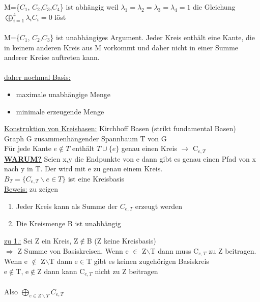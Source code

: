 M=\{$C_1$, $C_2$,$C_3$,$C_4$\} ist abhängig weil $\lambda_1=\lambda_2=\lambda_3=\lambda_4=1$ die Gleichung\\
$\bigoplus\limits_{i=1}^{4} \lambda_i C_i=0$ löst
\\\\
M=\{$C_1$, $C_2$,$C_3$\} ist unabhängiges Argument. Jeder Kreis enthält eine Kante, die in keinem anderen Kreis aus M vorkommt und daher nicht in einer Summe anderer Kreise auftreten kann.
\\\\
\underline{daher nochmal Basis:}
\begin{itemize}
	\item maximale unabhängige Menge
	\item minimale erzeugende Menge
\end{itemize}

\underline{Konstruktion von Kreisbasen:} Kirchhoff Basen (strikt fundamental Basen)
\\
Graph G zusammenhängender Spannbaum T von G\\
Für jede Kante $e\notin T$ enthält $T \cup \{e\}$ genau einen Kreis $\rightarrow$ C$_{e,T}$\\
\underline{\textbf{WARUM?}} Seien x,y die Endpunkte von e dann gibt es genau einen Pfad von x nach y in T. Der wird mit e zu genau einem Kreis.
\\
$B_T=\{C_{e,T}\backslash e \in T\}$ ist eine Kreisbasis
\\
\underline{Beweis:} zu zeigen
\begin{enumerate}
	\item Jeder Kreis kann als Summe der $C_{e,T}$ erzeugt werden
	\item Die Kreismenge B ist unabhängig
\end{enumerate}

\underline{zu 1.:} Sei Z ein Kreis, Z$\notin$B (Z keine Kreisbasis)\\
$\Rightarrow$ Z Summe von Basiskreisen. Wenn e $\in$ Z$\backslash$T dann muss C$_{e,T}$ zu Z beitragen. Wenn e $\notin$ Z$\backslash$T dann e$\in$T gibt es keinen zugehörigen Basiskreis\\
e$\notin$T, e$\notin$Z dann kann C$_{e,T}$ nicht zu Z beitragen\\\\
Also $\bigoplus\limits_{e \in Z\backslash T} C_{e,T}$

